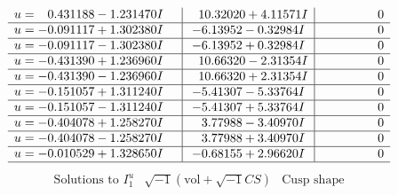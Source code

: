 \documentclass[1p]{elsarticle_modified}
\theoremstyle{definition}
\newcommand{\I}{\sqrt{-1}}
\begin{document}
$$\begin{array}{c|c|c}
\begin{aligned}
u &= \phantom{-}0.431188 - 1.231470 I\end{aligned}
 & \phantom{-}10.32020 + 4.11571 I & \phantom{-0.000000 } 0 \\ \hline\begin{aligned}
u &= -0.091117 + 1.302380 I\end{aligned}
 & -6.13952 - 0.32984 I & \phantom{-0.000000 } 0 \\ \hline\begin{aligned}
u &= -0.091117 - 1.302380 I\end{aligned}
 & -6.13952 + 0.32984 I & \phantom{-0.000000 } 0 \\ \hline\begin{aligned}
u &= -0.431390 + 1.236960 I\end{aligned}
 & \phantom{-}10.66320 - 2.31354 I & \phantom{-0.000000 } 0 \\ \hline\begin{aligned}
u &= -0.431390 - 1.236960 I\end{aligned}
 & \phantom{-}10.66320 + 2.31354 I & \phantom{-0.000000 } 0 \\ \hline\begin{aligned}
u &= -0.151057 + 1.311240 I\end{aligned}
 & -5.41307 - 5.33764 I & \phantom{-0.000000 } 0 \\ \hline\begin{aligned}
u &= -0.151057 - 1.311240 I\end{aligned}
 & -5.41307 + 5.33764 I & \phantom{-0.000000 } 0 \\ \hline\begin{aligned}
u &= -0.404078 + 1.258270 I\end{aligned}
 & \phantom{-}3.77988 - 3.40970 I & \phantom{-0.000000 } 0 \\ \hline\begin{aligned}
u &= -0.404078 - 1.258270 I\end{aligned}
 & \phantom{-}3.77988 + 3.40970 I & \phantom{-0.000000 } 0 \\ \hline\begin{aligned}
u &= -0.010529 + 1.328650 I\end{aligned}
 & -0.68155 + 2.96620 I & \phantom{-0.000000 } 0\\
 \hline 
 \end{array}$$\newpage$$\begin{array}{c|c|c}  
\text{Solutions to }I^u_{1}& \I (\text{vol} + \sqrt{-1}CS) & \text{Cusp shape}\\

\end{array}$$
\end{document}

